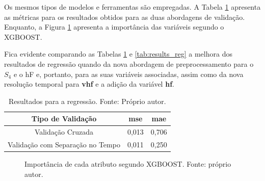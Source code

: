 Os mesmos tipos de modelos e ferramentas são empregadas. A Tabela \ref{tab:results_v1_reg} apresenta as métricas para os resultados obtidos para as duas abordagens de validação. Enquanto, a Figura \ref{fig:regv1} apresenta a importância das variáveis segundo o XGBOOST.

Fica evidente comparando as Tabelas \ref{tab:results_v1_reg} e \ref{tab:results_reg} a melhora dos resultados de regressão quando da nova abordagem de preprocessamento para o $S_4$ e o hF e, portanto, para as suas variáveis associadas, assim como da nova resolução temporal para {\bf vhf} e a adição da variável {\bf hf}.

\begin{table}[h]
\begin{center}
\begin{tabular}{|c|c|c|}
\hline
Tipo de Validação & mse       & mae   \\ \hline
Validação Cruzada                   & 0,013   & 0,706  \\ \hline
Validação com Separação no Tempo    & 0,011   & 0,250  \\ \hline
\end{tabular}
\end{center}
\vspace{12pt}
\caption{Resultados para a regressão. Fonte: Próprio autor.}
\label{tab:results_v1_reg}
\end{table}

\begin{figure}[h]
\center
{}
\caption{Importância de cada atributo segundo XGBOOST. Fonte: próprio autor.}\label{fig:regv1}
\end{figure}

